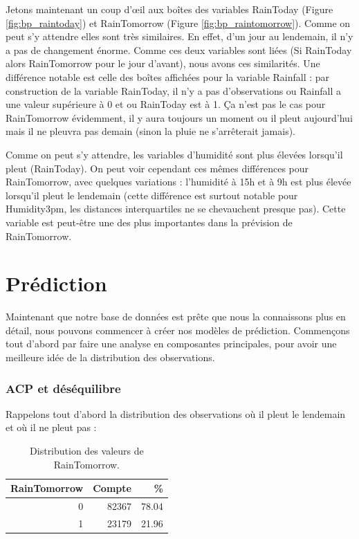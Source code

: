 \documentclass{article}
\begin{document}
Jetons maintenant un coup d'œil aux boîtes des variables RainToday (Figure \ref{fig:bp_raintoday}) et RainTomorrow (Figure \ref{fig:bp_raintomorrow}). Comme on peut s'y attendre elles sont très similaires. En effet, d'un jour au lendemain, il n'y a pas de changement énorme. Comme ces deux variables sont liées (Si RainToday alors RainTomorrow pour le jour d'avant), nous avons ces similarités. Une différence notable est celle des boîtes affichées pour la variable Rainfall : par construction de la variable RainToday, il n'y a pas d'observations ou Rainfall a une valeur supérieure à 0 et ou RainToday est à 1. Ça n'est pas le cas pour RainTomorrow évidemment, il y aura toujours un moment ou il pleut aujourd'hui mais il ne pleuvra pas demain (sinon la pluie ne s'arrêterait jamais).

Comme on peut s'y attendre, les variables d'humidité sont plus élevées lorsqu'il pleut (RainToday). On peut voir cependant ces mêmes différences pour RainTomorrow, avec quelques variations : l'humidité à 15h et à 9h est plus élevée lorsqu'il pleut le lendemain (cette différence est surtout notable pour Humidity3pm, les distances interquartiles ne se chevauchent presque pas). Cette variable est peut-être une des plus importantes dans la prévision de RainTomorrow.

\part{Prédiction}

Maintenant que notre base de données est prête que nous la connaissons plus en détail, nous pouvons commencer à créer nos modèles de prédiction. Commençons tout d'abord par faire une analyse en composantes principales, pour avoir une meilleure idée de la distribution des observations.

\section{ACP et déséquilibre}

Rappelons tout d'abord la distribution des observations où il pleut le lendemain et où il ne pleut pas : 

\begin{table}[H]
    \centering
        \begin{tabular}{|rrr|}
            \hline
            RainTomorrow & Compte & \% \\ 
            \hline
            \hline
            0 & 82367 & 78.04 \\
            1 & 23179 & 21.96 \\
            \hline
        \end{tabular}
    \caption{Distribution des valeurs de RainTomorrow.}
\end{table}
\end{document}
